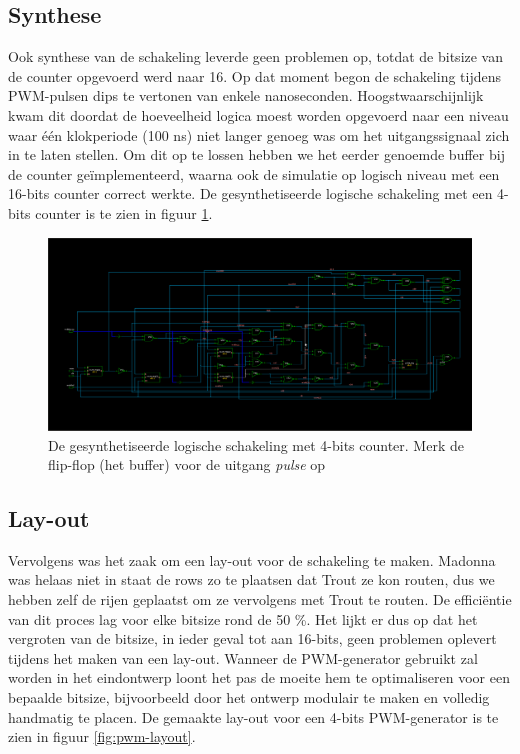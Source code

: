 \documentclass{article}
\begin{document}
\subsection{Synthese}
\label{ssec:pwm-impl-synth}
Ook synthese van de schakeling leverde geen problemen op, totdat de bitsize van de counter opgevoerd werd naar 16. Op dat moment begon de schakeling tijdens PWM-pulsen dips te vertonen van enkele nanoseconden. Hoogstwaarschijnlijk kwam dit doordat de hoeveelheid logica moest worden opgevoerd naar een niveau waar één klokperiode (100 ns) niet langer genoeg was om het uitgangssignaal zich in te laten stellen. Om dit op te lossen hebben we het eerder genoemde buffer bij de counter geïmplementeerd, waarna ook de simulatie op logisch niveau met een 16-bits counter correct werkte.
De gesynthetiseerde logische schakeling met een 4-bits counter is te zien in figuur \ref{fig:pwm-logic}.

\begin{figure}[H]
	\centering
	\includegraphics[width=\textwidth]{resource/pwm_gen_logic.png}
	\caption{De gesynthetiseerde logische schakeling met 4-bits counter. Merk de flip-flop (het buffer) voor de uitgang \textit{pulse} op}
	\label{fig:pwm-logic}
\end{figure}

\subsection{Lay-out}
\label{ssec:pwm-impl-layout}
Vervolgens was het zaak om een lay-out voor de schakeling te maken. Madonna was helaas niet in staat de rows zo te plaatsen dat Trout ze kon routen, dus we hebben zelf de rijen geplaatst om ze vervolgens met Trout te routen. De efficiëntie van dit proces lag voor elke bitsize rond de 50 \%. Het lijkt er dus op dat het vergroten van de bitsize, in ieder geval tot aan 16-bits, geen problemen oplevert tijdens het maken van een lay-out. Wanneer de PWM-generator gebruikt zal worden in het eindontwerp loont het pas de moeite hem te optimaliseren voor een bepaalde bitsize, bijvoorbeeld door het ontwerp modulair te maken en volledig handmatig te placen.
De gemaakte lay-out voor een 4-bits PWM-generator is te zien in figuur \ref{fig:pwm-layout}.
\end{document}
